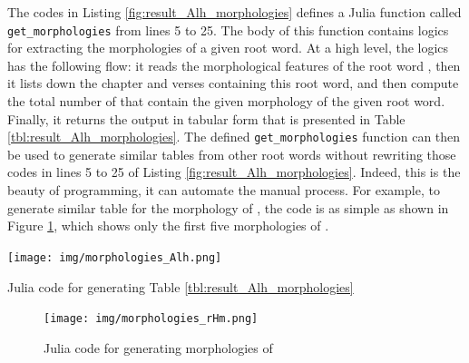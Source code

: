 The codes in Listing \ref{fig:result_Alh_morphologies} defines a Julia function called \verb|get_morphologies| from lines 5 to 25. The body of this function contains logics for extracting the morphologies of a given root word. At a high level, the logics has the following flow: it reads the morphological features of the root word , then it lists down the chapter and verses containing this root word, and then compute the total number of   that contain the given morphology of the given root word. Finally, it returns the output in tabular form that is presented in Table \ref{tbl:result_Alh_morphologies}. The defined \verb|get_morphologies| function can then be used to generate similar tables from other root words without rewriting those codes in lines 5 to 25 of Listing \ref{fig:result_Alh_morphologies}. Indeed, this is the beauty of programming, it can automate the manual process. For example, to generate similar table for the morphology of , the code is as simple as shown in Figure \ref{fig:result_rHm_morphologies}, which shows only the first five morphologies of .

\begin{listing2}[!t]
    \centering
    \texttt{[image: img/morphologies\_Alh.png]}
    \caption{Julia code for generating Table \ref{tbl:result_Alh_morphologies}}
    \label{fig:result_Alh_morphologies}
\end{listing2}

\begin{figure}[!t]
    \centering
    \texttt{[image: img/morphologies\_rHm.png]}
    \caption{Julia code for generating morphologies of }
    \label{fig:result_rHm_morphologies}
\end{figure}

